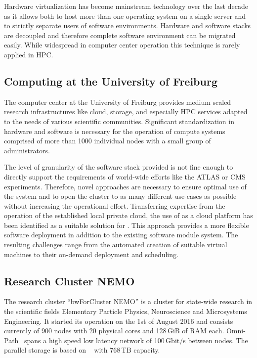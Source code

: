 Hardware virtualization has become mainstream technology over the last decade as it allows
both to host more than one operating system on a single server and to strictly
separate users of software environments.
Hardware and software stacks are decoupled and therefore complete software
environment can be migrated easily.
While widespread in computer center
operation this technique is rarely applied in HPC.

\subsection{Computing at the University of Freiburg}

The computer center at the University of Freiburg provides
medium scaled research
infrastructures like cloud, storage, and especially HPC services adapted to the
needs of various scientific communities. Significant standardization
in hardware and software is necessary for the operation of compute systems comprised of
more than 1000 individual nodes with a small group of administrators.

The level of granularity of the software stack provided is not fine enough to
directly support the requirements of world-wide efforts like the
ATLAS or CMS experiments.
Therefore, novel approaches are necessary to ensure optimal use of the system and to open the cluster to as many different use-cases as
possible without increasing the operational effort.
Transferring expertise from the operation of the established local
private cloud, %
the use of \Openstack as a cloud platform has been identified
as a
suitable solution for \NEMO. This approach provides a more flexible software
deployment in addition to the existing software module system.
The resulting challenges range from the automated creation of suitable
virtual machines to their on-demand deployment and scheduling.

\subsection{Research Cluster NEMO}

The research cluster ``bwForCluster NEMO'' is a cluster for state-wide
research in the scientific fields Elementary Particle Physics, Neuroscience and
Microsystems Engineering. It started its operation on the 1st of August 2016
and consists currently of 900 nodes with 20 physical cores and 128\,GiB of RAM each.
Omni-Path~\cite{Omnipath} spans a high speed low latency network of 100\,Gbit/s between nodes.
The parallel storage is based on \BeeGFS~\cite{BeeGFS} with
768\,TB capacity.

